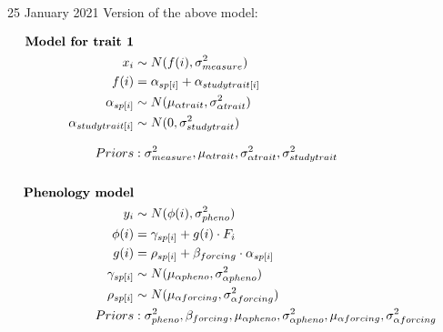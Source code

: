 \documentclass[11pt,letter]{article}
\begin{document}
25 January 2021 Version of the above model:

\begin{align*}
  \textbf{Model for trait 1} \\
  x_{i} & \sim N(f(i), \sigma^2_{measure}) \\
  f(i) &= \alpha_{sp[i]} + \alpha_{studytrait[i]} \\
  \alpha_{sp[i]} & \sim N(\mu_{\alpha trait}, \sigma^2_{\alpha trait}) \\
  \alpha_{studytrait[i]}  & \sim N(0, \sigma^2_{studytrait})\\[.75em]
  Priors &: \sigma^2_{measure}, \mu_{\alpha trait}, \sigma^2_{\alpha trait}, \sigma^2_{studytrait} \\
  \vspace{1ex}\\
  \textbf{Phenology model} \\
  y_{i} & \sim N(\phi(i), \sigma^2_{pheno}) \\
  \phi(i) &= \gamma_{sp[i]} + g(i) \cdot F_i\\
  g(i) & = \rho_{sp[i]} + \beta_{forcing} \cdot \alpha_{sp[i]} \\
  \gamma_{sp[i]} & \sim N(\mu_{\alpha pheno}, \sigma^2_{\alpha pheno}) \\
  \rho_{sp[i]} & \sim N(\mu_{\alpha forcing}, \sigma^2_{\alpha forcing})\\
  Priors &: \sigma^2_{pheno}, \beta_{forcing}, \mu_{\alpha pheno}, \sigma^2_{\alpha pheno}, \mu_{\alpha forcing}, \sigma^2_{\alpha forcing}
\end{align*}
\end{document}
